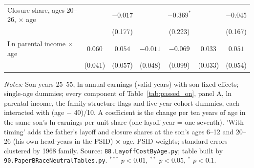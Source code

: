 \begin{table}[!htbp]
{{\begin{tabular}{lcccccc}
Closure share, ages 20--26, $\times$ age &  & $-0.017$ &  & $-0.369^{*}$ &  & $-0.045$ \\
 &  & (0.177) &  & (0.223) &  & (0.167) \\
Ln parental income $\times$ age & $0.060$ & $0.054$ & $-0.011$ & $-0.069$ & $0.033$ & $0.051$ \\
 & (0.041) & (0.057) & (0.048) & (0.099) & (0.033) & (0.054) \\
\bottomrule
\end{tabular}}}
\par\smallskip
\begin{minipage}{\textwidth}\footnotesize \textit{Notes:} Son-years 25--55, ln annual earnings (valid years) with son fixed effects; single-age dummies; every component of Table~\ref{tab:passed_on}, panel A, ln parental income, the family-structure flags and five-year cohort dummies, each interacted with (age $-$ 40)/10. A coefficient is the change per ten years of age in the same son's ln earnings per unit share (one layoff year = one seventh). 'With timing' adds the father's layoff and closure shares at the son's ages 6--12 and 20--26 (his own head-years in the PSID) $\times$ age. PSID weights; standard errors clustered by 1968 family. Source: \texttt{88.LayoffCostByAge.py}; table built by \texttt{90.PaperBRaceNeutralTables.py}. $^{***}$ $p<0.01$, $^{**}$ $p<0.05$, $^{*}$ $p<0.1$.\end{minipage}
\end{table}
